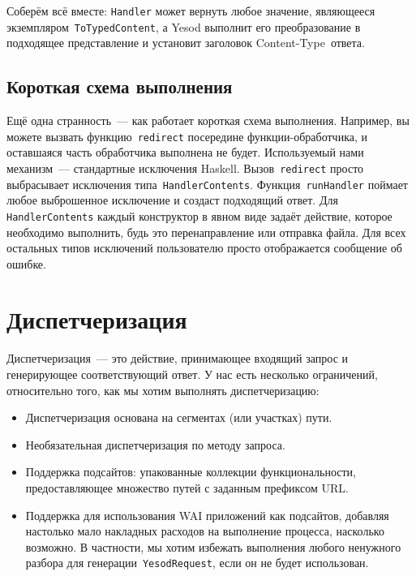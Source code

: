 Соберём всё вместе: \lstinline'Handler' может вернуть любое значение,
являющееся экземпляром~\lstinline'ToTypedContent', а Yesod выполнит его
преобразование в подходящее представление и установит заголовок
Content-Type~ответа.

\subsection{Короткая схема выполнения}
Ещё одна странность~--- как работает короткая схема выполнения. Например, вы
можете вызвать функцию~\lstinline'redirect' посередине функции-обработчика, и
оставшаяся часть обработчика выполнена не будет. Используемый нами механизм~---
стандартные исключения Haskell. Вызов~\lstinline'redirect' просто выбрасывает
исключения типа~\lstinline'HandlerContents'. Функция~\lstinline'runHandler'
поймает любое выброшенное исключение и создаст подходящий ответ. Для
\lstinline'HandlerContents' каждый конструктор в явном виде задаёт действие,
которое необходимо выполнить, будь это перенаправление или отправка файла. Для
всех остальных типов исключений пользователю просто отображается сообщение об
ошибке.

\section{Диспетчеризация}
Диспетчеризация~--- это действие, принимающее входящий запрос и генерирующее
соответствующий ответ. У нас есть несколько ограничений, относительно того, как
мы хотим выполнять диспетчеризацию:
\begin{itemize}
    \item Диспетчеризация основана на сегментах (или участках) пути.

    \item Необязательная диспетчеризация по методу запроса.

    \item Поддержка подсайтов: упакованные коллекции функциональности,
        предоставляющее множество путей с заданным префиксом URL.

    \item Поддержка для использования WAI приложений как подсайтов, добавляя
        настолько мало накладных расходов на выполнение процесса, насколько
        возможно. В частности, мы хотим избежать выполнения любого ненужного
        разбора для генерации~\lstinline'YesodRequest', если он не будет
        использован.
\end{itemize}


